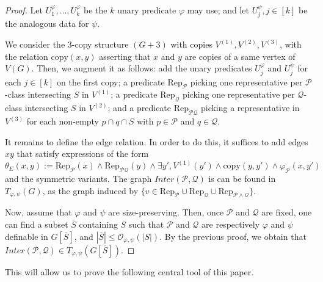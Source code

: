 \documentclass[11pt]{article}
\theoremstyle{definition}
\newcommand{\Oh}{\mathcal{O}}
\renewcommand{\le}{\leqslant}
\let\phi\varphi
\newcommand{\Pp}{\mathcal{P}}
\newcommand{\Qq}{\mathcal{Q}}
\begin{document}
\begin{proof}

Let $U_1^\phi, \ldots, U_k^\phi$ be the $k$ unary predicate $\phi$ may use; and let $U_j^\psi, j \in [k]$ be the analogous data for $\psi$. 

We consider the $3$-copy structure $(G+3)$ with copies $V^{(1)}, V^{(2)}, V^{(3)}$, with the relation $\text{copy}(x, y)$ asserting that $x$ and $y$ are copies of a same vertex of $V(G)$. Then, we augment it as follows: add the unary predicates $U_j^\phi$ and $U_j^\psi$ for each $j \in [k]$ on the first copy; a predicate $\mathrm{Rep}_{\Pp}$ picking one representative per $\Pp$-class intersecting $S$ in $V^{(1)}$; a predicate $\mathrm{Rep}_{\Qq}$ picking one representative per $\Qq$-class intersecting $S$ in $V^{(2)}$; and a predicate $\mathrm{Rep}_{\Pp \Qq}$ picking a representative in $V^{(3)}$ for each non-empty $p \cap q \cap S$ with $p \in \Pp$ and $q \in \Qq$.

It remains to define the edge relation.
In order to do this, it suffices to add edges $xy$ that satisfy expressions of the form
\[
\theta_E(x, y) := \mathrm{Rep}_{\Pp}(x) \wedge \mathrm{Rep}_{\Pp \Qq}(y) \wedge \exists y', V^{(1)}(y') \wedge \text{copy}(y, y') \wedge  \phi_{\Pp}(x, y')
\]
and the symmetric variants.
The graph $Inter(\Pp, \Qq)$ is can be found in $T_{\phi, \psi}(G)$, as the graph induced by $\{v \in  \mathrm{Rep}_{\Pp} \cup \mathrm{Rep}_{\Qq} \cup \mathrm{Rep}_{\Pp \wedge \Qq}\}$.

Now, assume that $\phi$ and $\psi$ are size-preserving. Then, once $\Pp$ and $\Qq$ are fixed, one can find a subset $\overline{S}$ containing $S$ such that $\Pp$ and $\Qq$ are respectively $\phi$ and $\psi$ definable in $G[\overline{S}]$, and $|\overline{S}| \le \Oh_{\phi, \psi}(|S|)$.
By the previous proof, we obtain that $Inter(\Pp, \Qq) \in T_{\phi, \psi}(G[\overline{S}])$.
\end{proof}

This will allow us to prove the following central tool of this paper.
\end{document}
